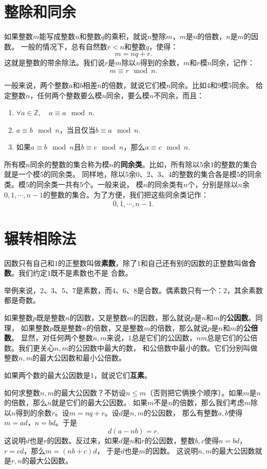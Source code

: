 \documentclass[12pt,UTF8]{ctexbook}
\begin{document}
\section{整除和同余}
如果整数$m$能写成整数$n$和整数$q$的乘积，就说$n$整除$m$，$m$是$n$的倍数，$n$是$m$的因数。
一般的情况下，总有自然数$r < n$和整数$q$，使得：
$$ m = nq + r.$$
这就是整数的带余除法。我们说$r$是$m$除以$n$得到的余数，$m$和$r$模$n$同余，记作：
$$ m \equiv r \mod n.$$

一般来说，两个整数$a$和$b$相差$n$的倍数，就说它们模$n$同余。比如$4$和$9$模$5$同余。
给定整数$n$，任何两个整数要么模$n$同余，要么模$n$不同余，而且：
\begin{enumerate}
    \item $\forall a \in \mathbb{Z}, \quad a \equiv a \mod n.$
    \item $a \equiv b \mod n$，当且仅当$b \equiv a \mod n.$
    \item 如果$a \equiv b \mod n$且$b \equiv c \mod n$，那么$a \equiv c \mod n.$
\end{enumerate}
所有模$n$同余的整数的集合称为模$n$的\textbf{同余类}。比如，所有除以$5$余$1$的整数的集合就是一个模$5$的同余类。
同样地，除以$5$余$0$、$2$、$3$、$4$的整数的集合各是模$5$的同余类。模$5$的同余类一共有$5$个。一般来说，
模$n$的同余类有$n$个，分别是除以$n$余$0,1,\cdots,n-1$的整数的集合。为了方便，我们把这些同余类记作：
$$ \overline{0}, \overline{1}, \cdots , \overline{n-1}.$$

\section{辗转相除法}
因数只有自己和$1$的正整数叫做\textbf{素数}，除了$1$和自己还有别的因数的正整数叫做\textbf{合数}。我们约定$1$既不是素数也不是
合数。

举例来说，$2$、$3$、$5$、$7$是素数，而$4$、$6$、$8$是合数。偶素数只有一个：$2$，其余素数都是奇数。

如果整数$p$既是整数$n$的因数，又是整数$m$的因数，那么就说$p$是$n$和$m$的\textbf{公因数}。同理，
如果整数$p$既是整数$n$的倍数，又是整数$m$的倍数，那么就说$p$是$n$和$m$的\textbf{公倍数}。
显然，对任何两个整数$n,m$来说，$1$总是它们的公因数，$nm$总是它们的公倍数。我们更关心$n,m$的公因数中最大的数，
和公倍数中最小的数。它们分别叫做整数$n,m$的最大公因数和最小公倍数。

如果两个数的最大公因数是$1$，就说它们\textbf{互素}。

如何求整数$n,m$的最大公因数？不妨设$n\leqslant m$（否则把它俩换个顺序）。如果$m$是$n$的倍数，那么$n$就是它们的最大公因数。
如果$m$不是$n$的倍数，那么我们考虑$m$除以$n$得到的余数$r$。设$m = nq + r$。设$d$是$n,m$的公因数，
那么有整数$a,b$使得$m = ad$，$n = bd$。于是
$$ d(a - nb) = r.$$
这说明$d$也是$r$的因数。反过来，如果$d$是$n$和$r$的公因数，整数$b, c$使得$n = bd$，$r = cd$，那么$m = (nb + c)d$，
于是$d$也是$m$的因数。
这说明$n,m$的最大公因数就是$r,n$的最大公因数。
\end{document}
